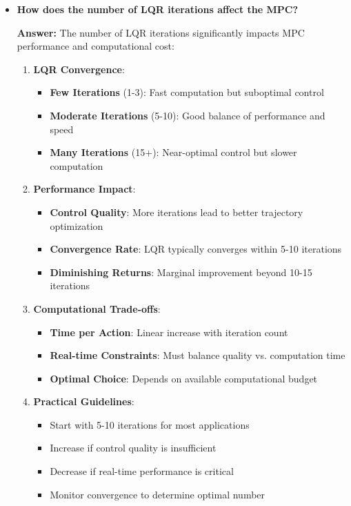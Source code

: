 \begin{itemize} 
    \item \textbf{How does the number of LQR iterations affect the MPC?}
    
    \textbf{Answer:} The number of LQR iterations significantly impacts MPC performance and computational cost:
    
    \begin{enumerate}
        \item \textbf{LQR Convergence}:
        \begin{itemize}
            \item \textbf{Few Iterations} (1-3): Fast computation but suboptimal control
            \item \textbf{Moderate Iterations} (5-10): Good balance of performance and speed
            \item \textbf{Many Iterations} (15+): Near-optimal control but slower computation
        \end{itemize}
        
        \item \textbf{Performance Impact}:
        \begin{itemize}
            \item \textbf{Control Quality}: More iterations lead to better trajectory optimization
            \item \textbf{Convergence Rate}: LQR typically converges within 5-10 iterations
            \item \textbf{Diminishing Returns}: Marginal improvement beyond 10-15 iterations
        \end{itemize}
        
        \item \textbf{Computational Trade-offs}:
        \begin{itemize}
            \item \textbf{Time per Action}: Linear increase with iteration count
            \item \textbf{Real-time Constraints}: Must balance quality vs. computation time
            \item \textbf{Optimal Choice}: Depends on available computational budget
        \end{itemize}
        
        \item \textbf{Practical Guidelines}:
        \begin{itemize}
            \item Start with 5-10 iterations for most applications
            \item Increase if control quality is insufficient
            \item Decrease if real-time performance is critical
            \item Monitor convergence to determine optimal number
        \end{itemize}
    \end{enumerate}
    

\end{itemize}
